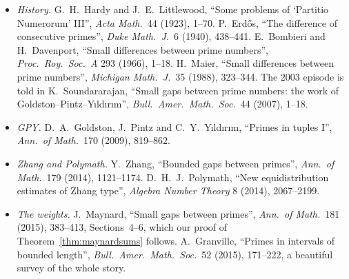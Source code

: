 \begin{itemize}
\item \emph{History.} G.~H.~Hardy and J.~E.~Littlewood, ``Some problems of `Partitio Numerorum' III'', \emph{Acta Math.}\ 44 (1923), 1--70. P.~Erdős, ``The difference of consecutive primes'', \emph{Duke Math.\ J.}\ 6 (1940), 438--441. E.~Bombieri and H.~Davenport, ``Small differences between prime numbers'', \emph{Proc.\ Roy.\ Soc.\ A} 293 (1966), 1--18. H.~Maier, ``Small differences between prime numbers'', \emph{Michigan Math.\ J.}\ 35 (1988), 323--344. The 2003 episode is told in K.~Soundararajan, ``Small gaps between prime numbers: the work of Goldston--Pintz--Yıldırım'', \emph{Bull.\ Amer.\ Math.\ Soc.}\ 44 (2007), 1--18.
\item \emph{GPY.} D.~A.~Goldston, J.~Pintz and C.~Y.~Yıldırım, ``Primes in tuples I'', \emph{Ann.\ of Math.}\ 170 (2009), 819--862.
\item \emph{Zhang and Polymath.} Y.~Zhang, ``Bounded gaps between primes'', \emph{Ann.\ of Math.}\ 179 (2014), 1121--1174. D.~H.~J.~Polymath, ``New equidistribution estimates of Zhang type'', \emph{Algebra Number Theory} 8 (2014), 2067--2199.
\item \emph{The weights.} J.~Maynard, ``Small gaps between primes'', \emph{Ann.\ of Math.}\ 181 (2015), 383--413, Sections~4--6, which our proof of Theorem~\ref{thm:maynardsums} follows. A.~Granville, ``Primes in intervals of bounded length'', \emph{Bull.\ Amer.\ Math.\ Soc.}\ 52 (2015), 171--222, a beautiful survey of the whole story.
\end{itemize}
